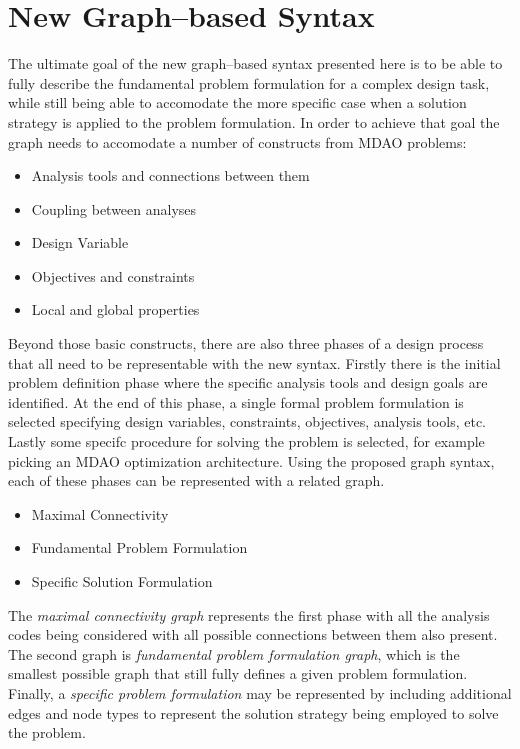 \section{New Graph--based Syntax}
The ultimate goal of the new graph--based syntax presented here is to be able to 
fully describe the fundamental problem formulation for a complex design task, 
while still being able to accomodate the more specific case when a solution 
strategy is applied to the problem formulation. In order to achieve that goal 
the graph needs to accomodate a number of constructs from MDAO problems: 

\begin{itemize}
    \item Analysis tools and connections between them
    \item Coupling between analyses
    \item Design Variable
    \item Objectives and constraints
    \item Local and global properties
\end{itemize}

Beyond those basic constructs, there are also three phases of a design process that 
all need to be representable with the new syntax. Firstly there is the initial problem definition
phase where the specific analysis tools and design goals are identified. At the end of this phase, 
a single formal problem formulation is selected specifying design variables, constraints, objectives, 
analysis tools, etc. Lastly some specifc procedure for solving the problem is selected, for example 
picking an MDAO optimization architecture. Using the proposed graph syntax, each of these phases 
can be represented with a related graph. 

\begin{itemize}
    \item Maximal Connectivity
    \item Fundamental Problem Formulation 
    \item Specific Solution Formulation
\end{itemize}

The \emph{maximal connectivity graph} represents the first phase with all the 
analysis codes being considered with all possible connections between them also present. The second graph 
is \emph{fundamental problem formulation graph}, which is the smallest possible graph 
that still fully defines a given problem formulation. Finally, a \emph{specific problem formulation} 
may be represented by including additional edges and node types to represent the 
solution strategy being employed to solve the problem. 

